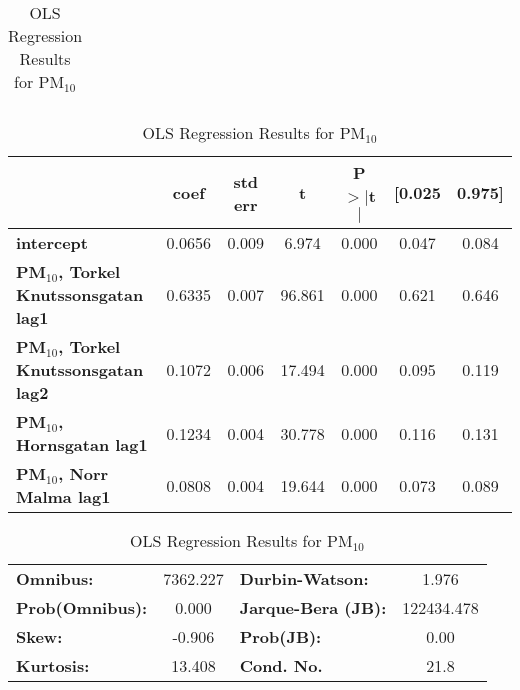 \begin{landscape}
\begin{table}[h]
\begin{center}
\begin{tabular}{lclc}
\bottomrule
\end{tabular}
\begin{tabular}{lcccccc}
                                                  & \textbf{coef} & \textbf{std err} & \textbf{t} & \textbf{P$> |$t$|$} & \textbf{[0.025} & \textbf{0.975]}  \\
\midrule
\textbf{intercept}                                &       0.0656  &        0.009     &     6.974  &         0.000        &        0.047    &        0.084     \\
\textbf{PM$_{10}$, Torkel Knutssonsgatan lag1} &       0.6335  &        0.007     &    96.861  &         0.000        &        0.621    &        0.646     \\
\textbf{PM$_{10}$, Torkel Knutssonsgatan lag2} &       0.1072  &        0.006     &    17.494  &         0.000        &        0.095    &        0.119     \\
\textbf{PM$_{10}$, Hornsgatan lag1}            &       0.1234  &        0.004     &    30.778  &         0.000        &        0.116    &        0.131     \\
\textbf{PM$_{10}$, Norr Malma lag1}            &       0.0808  &        0.004     &    19.644  &         0.000        &        0.073    &        0.089     \\
\bottomrule
\end{tabular}
\begin{tabular}{lclc}
\textbf{Omnibus:}       & 7362.227 & \textbf{  Durbin-Watson:     } &     1.976   \\
\textbf{Prob(Omnibus):} &   0.000  & \textbf{  Jarque-Bera (JB):  } & 122434.478  \\
\textbf{Skew:}          &  -0.906  & \textbf{  Prob(JB):          } &      0.00   \\
\textbf{Kurtosis:}      &  13.408  & \textbf{  Cond. No.          } &      21.8   \\
\bottomrule
\end{tabular}
\caption{OLS Regression Results for PM$_{10}$}
\end{center}
\end{table}
\end{landscape}

